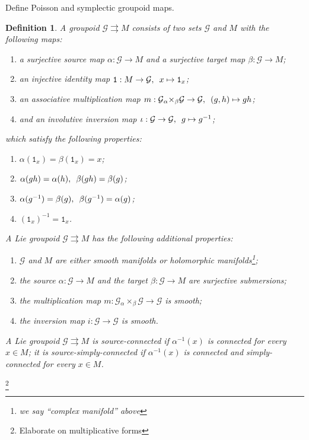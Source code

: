 \documentclass{amsart}
\newtheorem{definition}[theorem]{Definition}
\numberwithin{equation}{section}
\newcommand{\cG}{\mathcal{G}}
\begin{document}
{\color{red} Define Poisson and symplectic groupoid maps.}

\begin{definition}
  A \emph{groupoid} $\cG\rightrightarrows M$ consists of two sets $\cG$ and $M$ with the following maps:
  \begin{enumerate}
    \item a surjective \emph{source map} $\alpha: \cG \to M$ and a surjective \emph{target map} $\beta: \cG \to M$;
    \item an injective identity map $\mathtt{1}: M \to \cG, \enskip x \mapsto \mathtt{1}_x$;
    \item an associative multiplication map $m: \cG {_\alpha \times_\beta} \cG \to \cG, \enskip (g, h) \mapsto gh$;
    \item and an involutive inversion map $\iota: \cG \to \cG, \enskip g \mapsto g^{-1}$;
  \end{enumerate}
  which satisfy the following properties:
  \begin{enumerate}
    \item $\alpha(\mathtt{1}_x) = \beta(\mathtt{1}_x) = x$;
    \item $\alpha(gh) = \alpha(h), \enskip \beta(gh) = \beta(g)$;
    \item $\alpha(g^{-1}) = \beta(g), \enskip \beta(g^{-1}) = \alpha(g)$;
    \item $(\mathtt{1}_x)^{-1} = \mathtt{1}_x$.
  \end{enumerate}
  A \emph{Lie groupoid} $\cG \rightrightarrows M$ has the following additional properties:
  \begin{enumerate}
    \item $\cG$ and $M$ are either smooth manifolds or holomorphic manifolds\footnote{we say ``complex manifold'' above};
    \item the source $\alpha: \cG \to M$ and the target $\beta: \cG \to M$ are surjective submersions;
    \item the multiplication map $m: \cG {_\alpha \times_\beta} \cG \to \cG$ is smooth;
    \item the inversion map $i: \cG \to \cG$ is smooth.
  \end{enumerate}
  A Lie groupoid $\cG \rightrightarrows M$ is \emph{source-connected} if $\alpha^{-1}(x)$ is connected for every $x \in M$; it is \emph{source-simply-connected} if $\alpha^{-1}(x)$ is connected and simply-connected for every $x \in M$.
\end{definition}\footnote{Elaborate on multiplicative forms}
\end{document}
